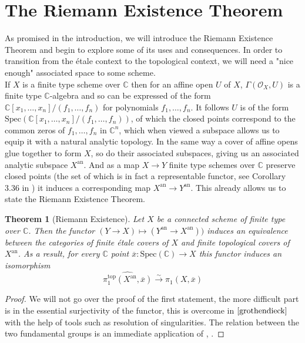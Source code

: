 \documentclass{article}
\newtheorem{theorem}{Theorem}[section]
\theoremstyle{definition}
\theoremstyle{remark}
\theoremstyle{plain}
\newcommand{\C}{\mathbb{C}}
\newcommand{\mc}[1]{\mathcal{#1}}
\begin{document}
\section{The Riemann Existence Theorem}

As promised in the introduction, we will introduce the Riemann Existence Theorem and begin to explore some of its uses and consequences.
In order to transition from the \'etale context to the topological context, we will need a "nice enough" associated space to some scheme.\\

\indent If $X$ is a finite type scheme over $\C$ then for an affine open $U$ of $X$, $\Gamma(\mc{O}_X, U)$ is a finite type $\C$-algebra and so can be expressed of the form $\C[x_1, \dots, x_n]/(f_1, \dots, f_n)$ for polynomials $f_1, \dots, f_n$.
It follows $U$ is of the form $\text{Spec}(\C[x_1, \dots, x_n]/(f_1, \dots, f_n))$, of which the closed points correspond to the common zeros of $f_1, \dots, f_n$ in $\C^n$, which when viewed a subspace allows us to equip it with a natural analytic topology.
In the same way a cover of affine opens glue together to form $X$, so do their associated subspaces, giving us an associated analytic subspace $X^{\text{an}}$.
And as a map $X \to Y$ finite type schemes over $\C$ preserve closed points (the set of which is in fact a representable functor, see Corollary 3.36 in \cite{GW}) it induces a corresponding map $X^{\text{an}} \to Y^{\text{an}}$.
This already allows us to state the Riemann Existence Theorem.


\begin{theorem}[Riemann Existence]
	Let $X$ be a connected scheme of finite type over $\C$.
	Then the functor $(Y \to X) \mapsto (Y^{\text{an}} \to X^{\text{an}}))$ induces an equivalence between the categories of finite \'etale covers of $X$ and finite topological covers of $X^{\text{an}}$.
	As a result, for every $\C$ point $\overline{x}: \text{Spec}(\C) \to X$ this functor induces an isomorphism
	\[\widehat{\pi_1^{\text{top}}(X^{\text{an}}, \overline{x})} \xrightarrow{\sim} \pi_1(X, \overline{x})\]
\end{theorem}

\begin{proof}
	We will not go over the proof of the first statement, the more difficult part is in the essential surjectivity of the functor, this is overcome in $\cite{grothendieck}$ with the help of tools such as resolution of singularities.
	The relation between the two fundamental groups is an immediate application of , .
\end{proof}
\end{document}
